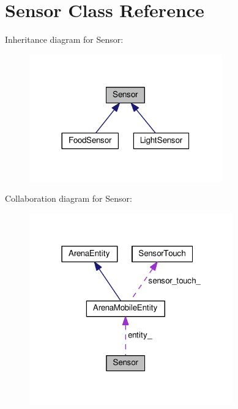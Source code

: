 \hypertarget{classSensor}{}\section{Sensor Class Reference}
\label{classSensor}


Inheritance diagram for Sensor\+:\nopagebreak
\begin{figure}[H]
\begin{center}
\leavevmode
\includegraphics[width=236pt]{classSensor__inherit__graph}
\end{center}
\end{figure}


Collaboration diagram for Sensor\+:\nopagebreak
\begin{figure}[H]
\begin{center}
\leavevmode
\includegraphics[width=250pt]{classSensor__coll__graph}
\end{center}
\end{figure}
